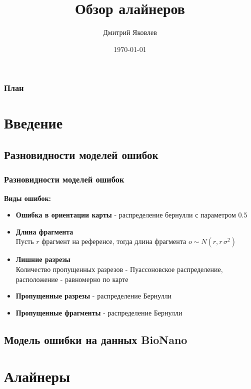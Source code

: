 \documentclass{beamer}
\title[Обзор алайнеров]{Обзор алайнеров}
\author{Дмитрий Яковлев}
\institute{EPAM Systems}
\date{\today}
\begin{document}
\graphicspath{{./img/}}

\begin{frame}
  \titlepage
\end{frame}

\begin{frame}
\frametitle{План}
\tableofcontents
\end{frame}

\section{Введение}


\subsection{Разновидности моделей ошибок}

\begin{frame}
\frametitle{Разновидности моделей ошибок}
\textbf{Виды ошибок:}
\begin{itemize}
  \item \textbf{Ошибка в ориентации карты} - распределение бернулли с параметром 0.5
  \item \textbf{Длина фрагмента} \\
  Пусть $r$ фрагмент на референсе, тогда длина фрагмента $o \sim N(r, r \, \sigma^2)$
  \item \textbf{Лишние разрезы} \\
  Количество пропущенных разрезов - Пуассоновское распределение, расположение - равномерно по карте
  \item \textbf{Пропущенные разрезы} - распределение Бернулли
  \item \textbf{Пропущенные фрагменты} - распределение Бернулли
\end{itemize}

\end{frame}

\subsection{Модель ошибки на данных BioNano}


\section{Алайнеры}
\end{document}
